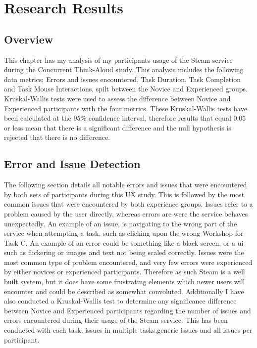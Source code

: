 
\chapter{Research Results}
\section{Overview} 
This chapter has my analysis of my participants usage of the Steam service during the Concurrent Think-Aloud study. This analysis includes the following data metrics; Errors and issues encountered, Task Duration, Task Completion and Task Mouse Interactions, spilt between the Novice and Experienced groups. Kruskal-Wallis tests were used to assess the difference between Novice and Experienced participants with the four metrics. These Kruskal-Wallis tests have been calculated at the 95\% confidence interval, therefore results that equal 0.05 or less mean that there is a significant difference and the null hypothesis is rejected that there is no difference.  


\section{Error and Issue Detection}
The following section details all notable errors and issues that were encountered by both sets of participants during this UX study. This is followed by the most common issues that were encountered by both experience groups. Issues refer to a problem caused by the user directly, whereas errors are were the service behaves unexpectedly. An example of an issue, is navigating to the wrong part of the service when attempting a task, such as clicking upon the wrong Workshop for Task C. An example of an error could be something like a black screen, or a \gls{ui} such as flickering or images and text not being scaled correctly. Issues were the most common type of problem encountered, and very few errors were experienced by either novices or experienced participants. Therefore as such Steam is a well built system, but it does have some frustrating elements which newer users will encounter and could be described as somewhat convoluted. Additionally I have also conducted a Kruskal-Wallis test to determine any significance difference between Novice and Experienced participants regarding the number of issues and errors encountered during their usage of the Steam service. This has been conducted with each task, issues in multiple tasks,generic issues and all issues per participant.

